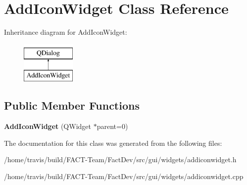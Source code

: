 \hypertarget{classAddIconWidget}{\section{Add\-Icon\-Widget Class Reference}
\label{classAddIconWidget}
}
Inheritance diagram for Add\-Icon\-Widget\-:\begin{figure}[H]
\begin{center}
\leavevmode
\includegraphics[height=2.000000cm]{db/d15/classAddIconWidget}
\end{center}
\end{figure}
\subsection*{Public Member Functions}
\begin{DoxyCompactItemize}
\item 
\hypertarget{classAddIconWidget_ac37149b853836442df2143b0ccc54f30}{{\bfseries Add\-Icon\-Widget} (Q\-Widget $\ast$parent=0)}\label{classAddIconWidget_ac37149b853836442df2143b0ccc54f30}

\end{DoxyCompactItemize}


The documentation for this class was generated from the following files\-:\begin{DoxyCompactItemize}
\item 
/home/travis/build/\-F\-A\-C\-T-\/\-Team/\-Fact\-Dev/src/gui/widgets/addiconwidget.\-h\item 
/home/travis/build/\-F\-A\-C\-T-\/\-Team/\-Fact\-Dev/src/gui/widgets/addiconwidget.\-cpp\end{DoxyCompactItemize}
